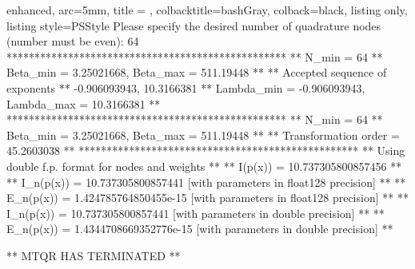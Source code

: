 \documentclass[a4paper, twosided]{book}
\begin{document}
\vspace{0.2cm}
\begin{tcblisting}{enhanced,
                   arc=5mm,
                   title = \color{black}{\large \ttfamily Building and executing the test driver: p\_2(x)},
                   colbacktitle=bashGray,
                   colback=black,
                   listing only,
                   listing style=PSStyle}
Please specify the desired number of quadrature nodes (number must be even): 64
 **************************************************
 ** N_min = 64
 ** Beta_min = 3.25021668, Beta_max = 511.19448 **
 ** Accepted sequence of exponents ** 
    {-0.906093943, 10.3166381}
 ** Lambda_min = -0.906093943, Lambda_max = 10.3166381 **
 **************************************************
 ** N_min = 64
 ** Beta_min = 3.25021668, Beta_max = 511.19448 **
 ** Transformation order = 45.2603038 **
 **************************************************
 ** Using double f.p. format for nodes and weights **
 ** I(p(x))   = 10.737305800857456 **
 ** I_n(p(x)) = 10.737305800857441     [with parameters in float128 precision] **
 ** E_n(p(x)) = 1.424785764850455e-15  [with parameters in float128 precision] **
 ** I_n(p(x)) = 10.737305800857441     [with parameters in double precision] **
 ** E_n(p(x)) = 1.4344708669352776e-15 [with parameters in double precision] **

 ** MTQR HAS TERMINATED **
\end{tcblisting}
\vspace{0.3cm}
\end{document}
